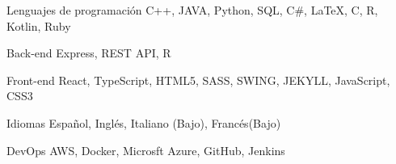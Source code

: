 

\begin{cvskills}
    \cvskill
    {Lenguajes de programación} %
    { C++, JAVA, Python, SQL, C\#, LaTeX, C, R, Kotlin, Ruby} %

    \cvskill
    {Back-end} %
    {Express, REST API, R} %

    \cvskill
    {Front-end} %
    {React, TypeScript, HTML5, SASS, SWING, JEKYLL, JavaScript, CSS3} %

    \cvskill
    {Idiomas} %
    {Español, Inglés, Italiano (Bajo), Francés(Bajo) } %
    
    \cvskill
    {DevOps} %
    {AWS, Docker, Microsft Azure, GitHub, Jenkins} %

\end{cvskills}
